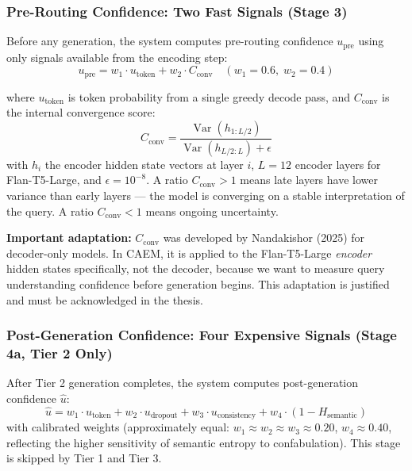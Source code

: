 \documentclass[12pt,a4paper]{article}
\theoremstyle{definition}
\newcommand{\caem}{\textsc{CAEM}}
\newcommand{\upre}{u_{\text{pre}}}
\newcommand{\uhat}{\hat{u}}
\newcommand{\Cconv}{C_{\text{conv}}}
\begin{document}
\subsubsection{Pre-Routing Confidence: Two Fast Signals (Stage 3)}

Before any generation, the system computes pre-routing confidence $\upre$ using only signals available from the encoding step:
\begin{equation}
\upre = w_1 \cdot u_{\text{token}} + w_2 \cdot \Cconv \quad (w_1 = 0.6,\; w_2 = 0.4)
\end{equation}

where $u_{\text{token}}$ is token probability from a single greedy decode pass, and $\Cconv$ is the internal convergence score:
\begin{equation}
\Cconv = \frac{\operatorname{Var}(h_{1:L/2})}{\operatorname{Var}(h_{L/2:L}) + \epsilon}
\end{equation}
with $h_i$ the encoder hidden state vectors at layer $i$, $L = 12$ encoder layers for Flan-T5-Large, and $\epsilon = 10^{-8}$. A ratio $\Cconv > 1$ means late layers have lower variance than early layers — the model is converging on a stable interpretation of the query. A ratio $\Cconv < 1$ means ongoing uncertainty.

\textbf{Important adaptation:} $\Cconv$ was developed by Nandakishor (2025) for decoder-only models. In \caem{}, it is applied to the Flan-T5-Large \textit{encoder} hidden states specifically, not the decoder, because we want to measure query understanding confidence before generation begins. This adaptation is justified and must be acknowledged in the thesis.

\subsubsection{Post-Generation Confidence: Four Expensive Signals (Stage 4a, Tier 2 Only)}

After Tier 2 generation completes, the system computes post-generation confidence $\uhat$:
\begin{equation}
\uhat = w_1 \cdot u_{\text{token}} + w_2 \cdot u_{\text{dropout}} + w_3 \cdot u_{\text{consistency}} + w_4 \cdot (1 - H_{\text{semantic}})
\end{equation}
with calibrated weights (approximately equal: $w_1 \approx w_2 \approx w_3 \approx 0.20$, $w_4 \approx 0.40$, reflecting the higher sensitivity of semantic entropy to confabulation). This stage is skipped by Tier 1 and Tier 3.
\end{document}
